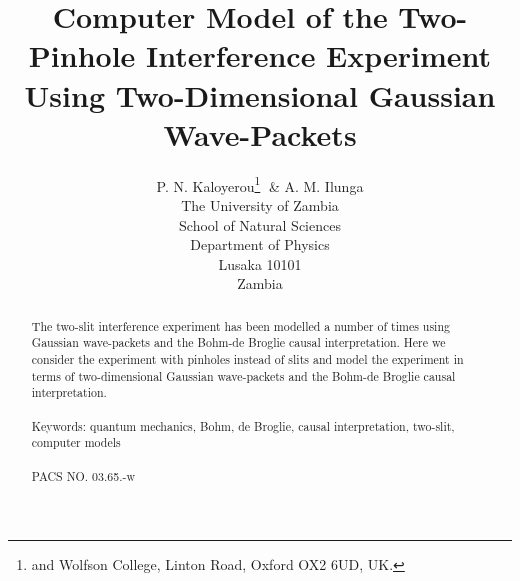 \documentclass[12pt]{article}       %
\title{Computer Model of  the Two-Pinhole Interference Experiment Using Two-Dimensional Gaussian Wave-Packets}
\author{ P. N. Kaloyerou\footnote{ and Wolfson College, Linton Road, Oxford OX2 6UD, UK.}  $\;$\& A. M. Ilunga \\
The University of Zambia\\ School of Natural Sciences \\
Department of Physics \\ 
Lusaka 10101\\ 
 Zambia}
\begin{document}




\maketitle

\begin{abstract}

The two-slit interference experiment has been modelled a number of times using Gaussian wave-packets and the Bohm-de Broglie causal interpretation. Here we consider the experiment with pinholes instead of slits and model the experiment in terms of two-dimensional Gaussian wave-packets and the Bohm-de Broglie causal interpretation.\\ \mbox{}\\
Keywords: quantum mechanics, Bohm, de Broglie, causal interpretation,  two-slit, computer models\\ \mbox{}\\
PACS NO. 03.65.-w 
\end{abstract}


\end{document}
